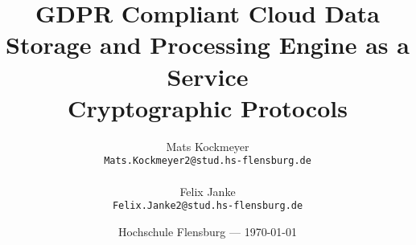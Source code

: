 \documentclass{article}
\title{GDPR Compliant Cloud Data Storage and Processing Engine as a Service\\[0.4em]\smaller{}\smaller{}Cryptographic Protocols}
\author{
	Mats Kockmeyer\\ \texttt{Mats.Kockmeyer2@stud.hs-flensburg.de}\\\\
	Felix Janke\\ \texttt{Felix.Janke2@stud.hs-flensburg.de}
}
\date{Hochschule Flensburg --- \today} %
\begin{document}
\begin{acronym}

\end{acronym}

\maketitle %

\newcommand{\acr}[1]{\acs{#1} (\aclu{#1})}

 \newcommand{\wip}[1]{
  \ifthenelse{\isempty{#1}}%
    {\colorbox{yellow!50}{$\boxast $}}%
    {\colorbox{yellow!50}{$\boxast $}\textit{\smaller{} #1} }%
   }






\begin{thebibliography}{9}


\end{thebibliography}
\end{document}
